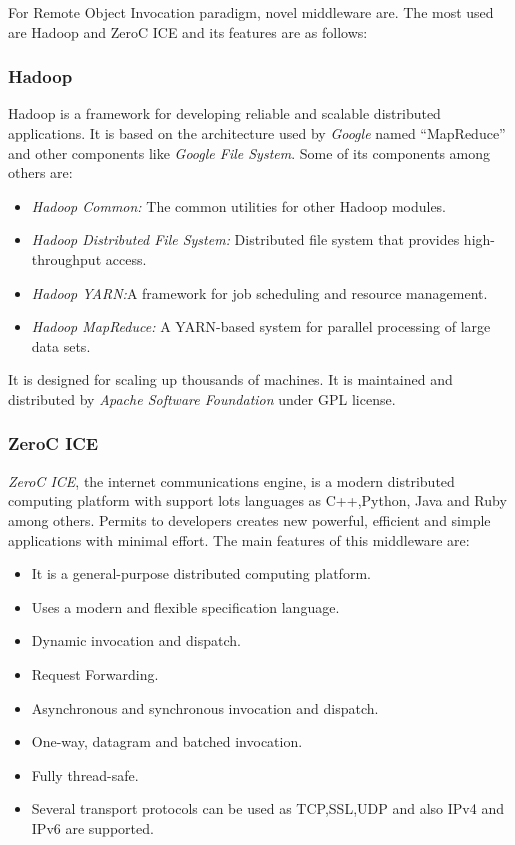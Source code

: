 For Remote Object Invocation paradigm, novel middleware are. The most used are
Hadoop and ZeroC \ac{ICE} and its features are as follows:

\subsubsection{Hadoop}
Hadoop is a framework for developing  reliable and scalable
distributed applications. It is based on
the architecture used by \emph{Google} named ``MapReduce'' and other components
like \emph{Google File System}. 
Some of its components among others are:
\begin{itemize}
\item \emph{Hadoop Common:} The common utilities for other Hadoop modules.
\item \emph{Hadoop Distributed File System:} Distributed file system that
  provides high-throughput access.
\item \emph{Hadoop YARN:}A framework for job scheduling and resource management.
\item \emph{Hadoop MapReduce:} A YARN-based system for parallel processing of
  large data sets.
\end{itemize}
It is designed for scaling up thousands of machines. It
is maintained and distributed by \emph{Apache Software Foundation} under GPL license.
 
\subsubsection{ZeroC ICE}
\emph{ZeroC \ac{ICE}}, the internet communications engine, is a modern distributed computing
platform with support lots languages as C++,Python, Java and Ruby among others.
Permits to developers creates new powerful, efficient and simple applications
with minimal effort.
The main features of this middleware are:
\begin{itemize}
\item It is a general-purpose distributed computing platform.
\item Uses a modern and flexible specification language.
\item Dynamic invocation and dispatch.
\item Request Forwarding.
\item Asynchronous and synchronous invocation and dispatch.
\item One-way, datagram and batched invocation.
\item Fully thread-safe.
\item Several transport protocols can be used as \ac{TCP},\ac{SSL},\ac{UDP} and also \ac{IP}v4 and
  \ac{IP}v6 are supported.
\end{itemize}

